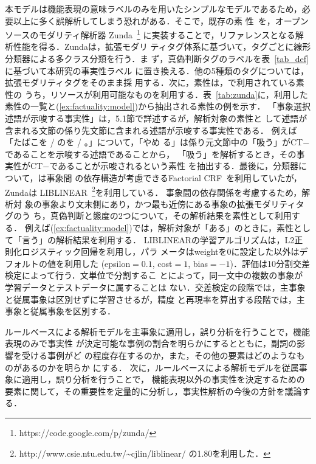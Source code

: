 \documentclass[japanese]{jnlp_1.4}
\def\event#1{}
\begin{document}
本モデルは機能表現の意味ラベルのみを用いたシンプルなモデルであるため，必
要以上に多く誤解析してしまう恐れがある．そこで，既存の素
性~\cite{Eguchi2010_nlp}を，オープンソースのモダリティ解析器
Zunda~\cite{Mizuno2013}\footnote{https://code.google.com/p/zunda/}
に実装することで，リファレンスとなる解析性能を得る．Zundaは，拡張モダリ
ティタグ体系に基づいて，タグごとに線形分類器による多クラス分類を行う．ま
ず，真偽判断タグのラベルを表~\ref{tab_def}に基づいて本研究の事実性ラベル
に置き換える．他の5種類のタグについては，拡張モダリティタグをそのまま採
用する．次に，素性は，で利用されている素性の
うち，リソースが利用可能なものを利用する．表~\ref{tab:zunda}に，利用した
素性の一覧と(\ref{ex:factuality:model})から抽出される素性の例を示す．
「事象選択述語が示唆する事実性」は，5.1節で詳述するが，解析対象の素性と
して述語が含まれる文節の係り先文節に含まれる述語が示唆する事実性である．
例えば「たばこを / \event{吸う}のを / \event{やめる}。」について，「やめ
る」は係り元文節中の「吸う」がCT$-$であることを示唆する述語であることから，
「吸う」を解析するとき，その事実性がCT$-$であることが示唆されるという素性
を抽出する．最後に，分類器について，は事象間
の依存構造が考慮できるFactorial CRF~\cite{Sutton2007}を利用していたが，
Zundaは
LIBLINEAR~\cite{REF08a}\footnote{http://www.csie.ntu.edu.tw/{\textasciitilde}cjlin/liblinear/ の1.80を利用した．}を利用している．
事象間の依存関係を考慮するため，解析対
象の事象より文末側にあり，かつ最も近傍にある事象の拡張モダリティタグのう
ち，真偽判断と態度の2つについて，その解析結果を素性として利用する．
例えば(\ref{ex:factuality:model})では，解析対象が「ある」のときに，素性として「言う」の解析結果を利用する．
LIBLINEARの学習アルゴリズムは，L2正則化ロジスティック回帰を利用し，パラ
メータはweightを0に設定した以外はデフォルトの値を利用した (epsilon$=0.1$,
cost$=1$, bias$=-1$)．評価は10分割交差検定によって行う．文単位で分割するこ
とによって，同一文中の複数の事象が学習データとテストデータに属することは
ない．交差検定の段階では，主事象と従属事象は区別せずに学習させるが，精度
と再現率を算出する段階では，主事象と従属事象を区別する．

ルールベースによる解析モデルを主事象に適用し，誤り分析を行うことで，機能表現のみで事実性
が決定可能な事例の割合を明らかにするとともに，副詞の影響を受ける事例がど
の程度存在するのか，また，その他の要素はどのようなものがあるのかを明らか
にする．
次に，ルールベースによる解析モデルを従属事象に適用し，誤り分析を行うことで，
機能表現以外の事実性を決定するための要素に関して，その重要性を定量的に分析し，事実性解析の今後の方針を議論する．
\end{document}
